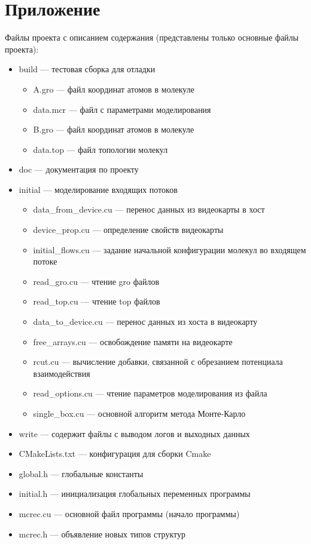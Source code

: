 \appendix
\section{Приложение}

Файлы проекта с описанием содержания (представлены только основные файлы проекта):
\begin{itemize}
	\item build --- тестовая сборка для отладки
	\begin{itemize}
		\item A.gro --- файл координат атомов в молекуле
		\item data.mcr --- файл с параметрами моделирования
		\item B.gro  --- файл координат атомов в молекуле 
		\item data.top --- файл топологии молекул
		
	\end{itemize}
	\item doc --- документация по проекту
	\item initial --- моделирование входящих потоков
	\begin{itemize}
		\item data\_from\_device.cu --- перенос данных из видеокарты в хост
		\item device\_prop.cu --- определение свойств видеокарты
		\item initial\_flows.cu --- задание начальной конфигурации молекул во входящем потоке
		\item read\_gro.cu  --- чтение gro файлов
		\item read\_top.cu --- чтение top файлов
		\item data\_to\_device.cu 	--- перенос данных из хоста в видеокарту
		\item free\_arrays.cu --- освобождение памяти на видеокарте
		\item rcut.cu --- вычисление добавки, связанной с обрезанием потенциала взаимодействия
		\item read\_options.cu --- чтение параметров моделирования из файла 
		\item single\_box.cu --- основной алгоритм метода Монте-Карло
	\end{itemize}
	\item write --- содержит файлы с выводом логов и выходных данных
	\item CMakeLists.txt --- конфигурация для сборки Cmake
	\item global.h --- глобальные константы
	\item initial.h --- инициализация глобальных переменных программы
	\item mcrec.cu --- основной файл программы (начало программы)
	\item mcrec.h --- объявление новых типов структур
		
\end{itemize}
